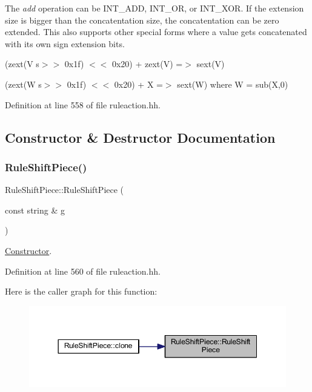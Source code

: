 The {\itshape add} operation can be I\+N\+T\+\_\+\+A\+DD, I\+N\+T\+\_\+\+OR, or I\+N\+T\+\_\+\+X\+OR. If the extension size is bigger than the concatentation size, the concatentation can be zero extended. This also supports other special forms where a value gets concatenated with its own sign extension bits.


\begin{DoxyItemize}
\item {\ttfamily (zext(V s$>$$>$ 0x1f) $<$$<$ 0x20) + zext(\+V) =$>$ sext(\+V)}
\item {\ttfamily (zext(W s$>$$>$ 0x1f) $<$$<$ 0x20) + X =$>$ sext(\+W) where W = sub(\+X,0)} 
\end{DoxyItemize}

Definition at line 558 of file ruleaction.\+hh.



\subsection{Constructor \& Destructor Documentation}
\mbox{\label{class_rule_shift_piece_ae172d9256665172380a01364810b1efa}} 
\subsubsection{\texorpdfstring{RuleShiftPiece()}{RuleShiftPiece()}}
{\footnotesize\ttfamily Rule\+Shift\+Piece\+::\+Rule\+Shift\+Piece (\begin{DoxyParamCaption}\item[{const string \&}]{g }\end{DoxyParamCaption})\hspace{0.3cm}{\ttfamily [inline]}}



\mbox{\hyperlink{class_constructor}{Constructor}}. 



Definition at line 560 of file ruleaction.\+hh.

Here is the caller graph for this function\+:
\nopagebreak
\begin{figure}[H]
\begin{center}
\leavevmode
\includegraphics[width=350pt]{class_rule_shift_piece_ae172d9256665172380a01364810b1efa_icgraph}
\end{center}
\end{figure}


